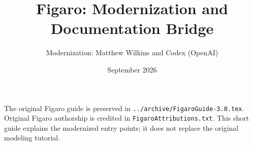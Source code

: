 \documentclass[11pt]{article}
\title{Figaro: Modernization and Documentation Bridge}
\author{Modernization: Matthew Wilkins and Codex (OpenAI)}
\date{September 2026}
\begin{document}
\maketitle
The original Figaro guide is preserved in
\texttt{../archive/FigaroGuide-3.0.tex}. Original Figaro authorship is credited
in \texttt{FigaroAttributions.txt}. This short guide explains the modernized
entry points; it does not replace the original modeling tutorial.

\end{document}
